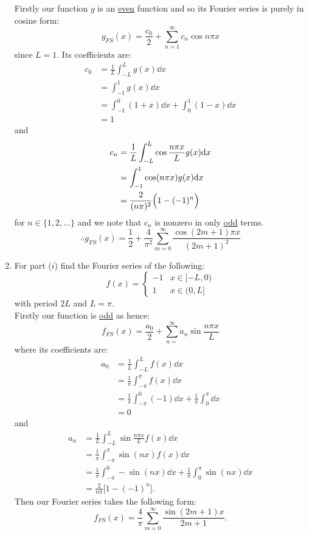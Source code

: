 \begin{enumerate}
    Firstly our function $g$ is an \underline{even} function
    and so its Fourier series is purely in cosine form:
    $$g_{FS}(x)=\frac{c_0}{2}+\sum_{n=1}^{\infty}c_n\cos n\pi x$$
    since $L=1$. Its coefficients are:
    \begin{align*}
        c_0
        &=\frac{1}{L}\int_{-L}^{L}g(x)\dd x \\
        &=\int_{-1}^{1}g(x)\dd x \\
        &=\int_{-1}^{0}(1+x)\dd x
        +\int_{0}^{1}(1-x)\dd x \\
        &=1
    \end{align*}
    and
    \begin{align*}
        c_n
        &=\frac{1}{L}\int_{-L}^{L}\cos\frac{n\pi x}{L}g(x)\dd x \\
        &=\int_{-1}^{1}\cos(n\pi x)g(x)\dd x \\
        &=\frac{2}{(n\pi)^2}\Bigl(1-(-1)^n\Bigr)
    \end{align*}
    for $n\in\{1,2,\dots\}$ and we note that $c_n$ is nonzero in only \underline{odd} terms.
    $$\therefore g_{FS}(x)=\frac{1}{2}+
    \frac{4}{\pi^2}\sum_{m=0}^{\infty}
    \frac{\cos(2m+1)\pi x}{(2m+1)^2}$$

    \newpage

    \item For part ($i$) find the Fourier series of the following:
    $$f(x)=
    \left\{
    \begin{array}{ll}
        -1  & \mbox{} x\in[-L,0) \\
        1 & \mbox{} x\in(0,L]
    \end{array}
    \right.$$
    with period $2L$ and $L=\pi$. \\

    Firstly our function is \underline{odd} as hence:
    $$f_{FS}(x)=\frac{a_0}{2}+\sum_{n=}^{\infty}
    a_n\sin\frac{n\pi x}{L}$$
    where its coefficients are:
    \begin{align*}
        a_0
        &=\frac{1}{L}\int_{-L}^{L}f(x)\dd x \\
        &=\frac{1}{\pi}\int_{-\pi}^{\pi}f(x)\dd x \\
        &=\frac{1}{\pi}\int_{-\pi}^{0}(-1)\dd x
        +\frac{1}{\pi}\int_{0}^{\pi}\dd x \\
        &=0
    \end{align*}
    and
    \begin{align*}
        a_n
        &=\frac{1}{L}\int_{-L}^{L}\sin\frac{n\pi x}{L}f(x)\dd x \\
        &=\frac{1}{\pi}\int_{-\pi}^{\pi}\sin(nx)f(x)\dd x \\
        &=\frac{1}{\pi}\int_{-\pi}^{0}-\sin(nx)\dd x
        +\frac{1}{\pi}\int_{0}^{\pi}\sin(nx)\dd x \\
        &=\frac{2}{n\pi}\bigl[1-(-1)^n\bigr].
    \end{align*}
    Then our Fourier series takes the following form:
    $$f_{FS}(x)=\frac{4}{\pi}\sum_{m=0}^{\infty}
    \frac{\sin(2m+1)x}{2m+1}.$$

    \newpage

    

\end{enumerate}